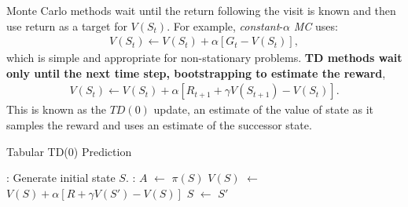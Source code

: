 \documentclass{article}
\newcommand*\Let[2]{\State #1 $\gets$ #2}
\newcommand{\ix}[1]{%
  \leavevmode %
  \marginpar{\small\emph{#1}}%
}
\begin{document}
\ix{TD Prediction}Monte Carlo methods wait until the return following the visit is known and then use return as a target for $V(S_t)$. For example, \emph{constant}-$\alpha$ \emph{MC} uses:
\begin{align}
V(S_t) \leftarrow V(S_t) + \alpha [G_t - V(S_t)],
\end{align}
which is simple and appropriate for non-stationary problems. \textbf{TD methods wait only until the next time step, bootstrapping to estimate the reward}, 
\begin{align}
V(S_t) \leftarrow V(S_t) + \alpha [R_{t+1} +\gamma V(S_{t+1}) - V(S_t)].
\end{align}
This is known as the $TD(0)$ update, an estimate of the value of state as it samples the reward and uses an estimate of the successor state. 

\begin{algorithm}[H]
	\caption{Tabular TD(0) Prediction
		\label{alg:tab_td_zero}}
	\begin{algorithmic}[1]
		\Statex 
		\Statex
		: 
		\State Generate initial state $S$. 
		:
		\Let{$A$}{$ \pi(S) $} 
		\State {}
		\Let{$V(S)$}{$V(S) + \alpha [R +\gamma V(S') - V(S)]$}
		\Let{$S$}{$S'$}
		\EndWhile
		\EndFor
	\end{algorithmic}
\end{algorithm}
\end{document}
